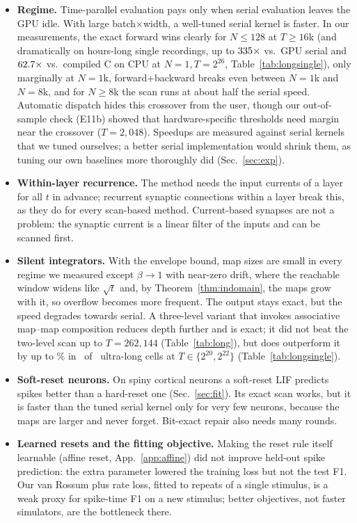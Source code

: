\documentclass[10pt]{article}
\theoremstyle{remark}
\begin{document}
\begin{itemize}[leftmargin=*]
\item \textbf{Regime.} Time-parallel evaluation pays only when serial evaluation leaves the GPU idle. With large batch$\times$width, a well-tuned serial kernel is faster. In our measurements, the exact forward wins clearly for $N\le128$ at $T\ge16$k (and dramatically on hours-long single recordings, up to $335\times$ vs.\ GPU serial and $62.7\times$ vs.\ compiled C on CPU at $N=1, T=2^{26}$, Table~\ref{tab:longsingle}), only marginally at $N=1$k, forward+backward breaks even between $N=1$k and $N=8$k, and for $N\ge8$k the scan runs at about half the serial speed. Automatic dispatch hides this crossover from the user, though our out-of-sample check (E11b) showed that hardware-specific thresholds need margin near the crossover ($T=2{,}048$). Speedups are measured against serial kernels that we tuned ourselves; a better serial implementation would shrink them, as tuning our own baselines more thoroughly did (Sec.~\ref{sec:exp}).
\item \textbf{Within-layer recurrence.} The method needs the input currents of a layer for all $t$ in advance; recurrent synaptic connections within a layer break this, as they do for every scan-based method. Current-based synapses are not a problem: the synaptic current is a linear filter of the inputs and can be scanned first.
\item \textbf{Silent integrators.} With the envelope bound, map sizes are small in every regime we measured except $\beta\to1$ with near-zero drift, where the reachable window widens like $\sqrt t$ and, by Theorem~\ref{thm:indomain}, the maps grow with it, so overflow becomes more frequent. The output stays exact, but the speed degrades towards serial. A three-level variant that invokes associative map--map composition reduces depth further and is exact; it did not beat the two-level scan up to $T=262{,}144$ (Table~\ref{tab:long}), but does outperform it by up to \LongSingleVFourMaxGain\% in \LongSingleVFourWins\ of \LongSingleCells\ ultra-long cells at $T\in\{2^{20},2^{22}\}$ (Table~\ref{tab:longsingle}).
\item \textbf{Soft-reset neurons.} On spiny cortical neurons a soft-reset LIF predicts spikes better than a hard-reset one (Sec.~\ref{sec:fit}). Its exact scan works, but it is faster than the tuned serial kernel only for very few neurons, because the maps are larger and never forget. Bit-exact repair also needs many rounds.
\item \textbf{Learned resets and the fitting objective.} Making the reset rule itself learnable (affine reset, App.~\ref{app:affine}) did not improve held-out spike prediction: the extra parameter lowered the training loss but not the test F1. Our van Rossum plus rate loss, fitted to repeats of a single stimulus, is a weak proxy for spike-time F1 on a new stimulus; better objectives, not faster simulators, are the bottleneck there.

\end{itemize}
\end{document}
